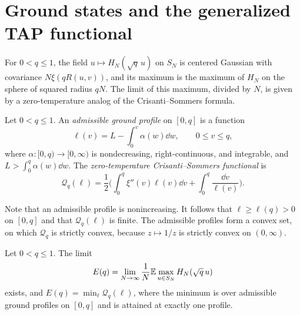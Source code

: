 \section{Ground states and the generalized TAP functional}\label{sec:th-inputs}

For $0<q\le1$, the field $u\mapsto H_N(\sqrt q\,u)$ on $S_N$ is centered Gaussian with covariance $N\xi(qR(u,v))$, and its maximum is the maximum of $H_N$ on the sphere of squared radius $qN$. The limit of this maximum, divided by $N$, is given by a zero-temperature analog of the Crisanti--Sommers formula.

\begin{definition}\label{def:th-ground}
Let $0<q\le1$. An \emph{admissible ground profile} on $[0,q]$ is a function
\[
\ell(v)=L-\int_0^v\alpha(w)\dd w,\qquad 0\le v\le q,
\]
where $\alpha\colon[0,q)\to[0,\infty)$ is nondecreasing, right-continuous, and integrable, and $L>\int_0^q\alpha(w)\dd w$. The \emph{zero-temperature Crisanti--Sommers functional} is
\begin{equation}\label{eq:th-ground-functional}
\mathcal Q_q(\ell)=\frac12\bigg(\int_0^q\xi''(v)\ell(v)\dd v+\int_0^q\frac{\dd v}{\ell(v)}\bigg).
\end{equation}
\end{definition}

Note that an admissible profile is nonincreasing. It follows that $\ell\ge\ell(q)>0$ on $[0,q]$ and that $\mathcal Q_q(\ell)$ is finite. The admissible profiles form a convex set, on which $\mathcal Q_q$ is strictly convex, because $z\mapsto1/z$ is strictly convex on $(0,\infty)$.

\begin{theorem}\label{thm:th-ground}
Let $0<q\le1$. The limit
\[
E(q)=\lim_{N\to\infty}\frac1N\mathbb E\max_{u\in S_N}H_N(\sqrt q\,u)
\]
exists, and $E(q)=\min_\ell\mathcal Q_q(\ell)$, where the minimum is over admissible ground profiles on $[0,q]$ and is attained at exactly one profile.
\end{theorem}

